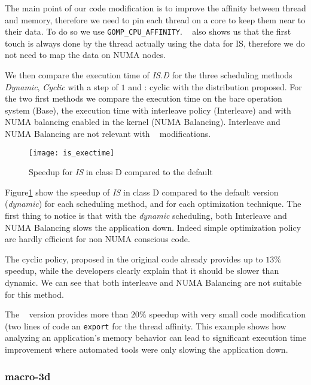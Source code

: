 The main point of our code modification is to improve the affinity between
thread and memory, therefore we need to pin each thread on a core to keep them
near to their data. To do so we use \texttt{GOMP\_CPU\_AFFINITY}. \TABARNAC~
also shows us that the first touch is always done by the thread actually using
the data for IS, therefore we do not need to map the data on NUMA nodes.

We then compare the execution time of \emph{IS.D} for the three scheduling
methods \emph{Dynamic}, \emph{Cyclic} with a step of $1$ and \TABARNAC:
cyclic with the distribution proposed. For the two first methods we compare the
execution time on the bare operation system  (Base), the execution time with
interleave policy (Interleave) and with NUMA balancing enabled in the kernel
(NUMA Balancing). Interleave and NUMA Balancing are not relevant with
\TABARNAC~ modifications.

\begin{figure}[htpb]
    \centering
    \texttt{[image: is\_exectime]}
    \caption{Speedup for \emph{IS} in class D compared to the default}
\label{fig:is-res}
\end{figure}

Figure\ref{fig:is-res} show the speedup of \emph{IS} in class D compared to
the default version (\emph{dynamic}) for each scheduling method, and for each
optimization technique. The first thing to notice is that with the
\emph{dynamic} scheduling, both Interleave and NUMA Balancing slows
the application down. Indeed simple optimization policy are hardly efficient
for non NUMA conscious code.

The cyclic policy, proposed in the original code already provides up to $13\%$
speedup, while the developers clearly explain that it should be slower than
dynamic. We can see that both interleave and NUMA Balancing are not suitable
for this method.

The \TABARNAC~ version provides more than $20\%$ speedup with very small code
modification (two lines of code an \texttt{export} for the thread affinity.
This example shows how analyzing an application's memory behavior can lead to
significant execution time improvement where automated tools were only slowing
the application down.

\subsubsection{macro-3d}
\label{sec:exp-macro3d}


